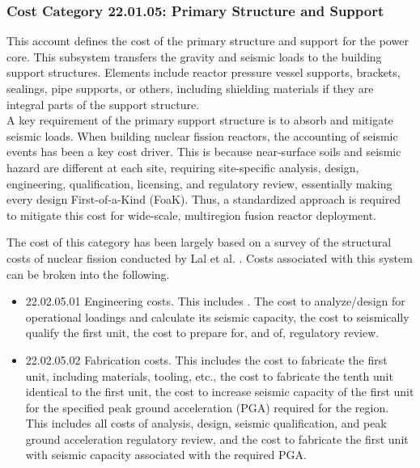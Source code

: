 
\subsubsection*{Cost Category 22.01.05:  Primary Structure and Support}
\label{sec:22.1.5}
This account defines the cost of the primary structure and support for the power core. This subsystem  transfers the gravity and seismic loads to the building support structures. Elements include reactor pressure vessel supports, brackets, sealings, pipe supports, or others, including shielding materials if they are integral parts of the support structure. \\

A key requirement of the primary support structure is to absorb and mitigate seismic loads. When building nuclear fission reactors, the accounting of seismic events has been a key cost driver. This is because near-surface soils and seismic hazard are different at each site, requiring site-specific analysis, design, engineering, qualification, licensing, and regulatory review, essentially making every design First-of-a-Kind (FoaK). Thus, a standardized approach is required to mitigate this cost for wide-scale, multiregion fusion reactor deployment.

The cost of this category has been largely based on a survey of the structural costs of nuclear fission conducted by Lal et al. \cite{lal2022towards}. Costs associated with this system can be broken into the following.
\begin{itemize}
    \item 22.02.05.01 Engineering costs. This includes . The cost to analyze/design for operational loadings and calculate its seismic capacity, the cost to seismically qualify the first unit, the cost to prepare for, and of, regulatory review.
    \item 22.02.05.02 Fabrication costs. This includes the cost to fabricate the first unit, including materials, tooling, etc., the cost to fabricate the tenth unit identical to the first unit, the cost to increase seismic capacity of the first unit for the specified peak ground acceleration (PGA) required for the region. This includes all costs of analysis, design, seismic qualification, and peak ground acceleration regulatory review, and the cost to fabricate the first unit with seismic capacity associated with the required PGA.
\end{itemize}

